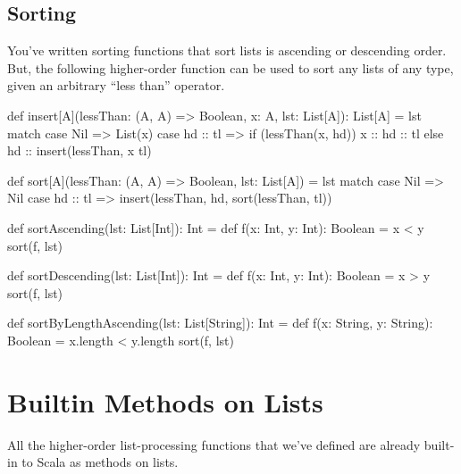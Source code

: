 \documentclass{book}
\begin{document}
\subsection{Sorting}

You've written sorting functions that sort lists is ascending or descending
order. But, the following higher-order function can be used to sort any
lists of any type, given an arbitrary ``less than'' operator.

\begin{scalacode}
def insert[A](lessThan: (A, A) => Boolean, x: A, lst: List[A]): List[A] = lst match {
  case Nil => List(x)
  case hd :: tl => {
    if (lessThan(x, hd)) {
      x :: hd :: tl
    }
    else {
      hd :: insert(lessThan, x tl)
    }
  }
}

def sort[A](lessThan: (A, A) => Boolean, lst: List[A]) = lst match {
  case Nil => Nil
  case hd :: tl => insert(lessThan, hd, sort(lessThan, tl))
}

def sortAscending(lst: List[Int]): Int = {
  def f(x: Int, y: Int): Boolean = x < y
  sort(f, lst)
}

def sortDescending(lst: List[Int]): Int = {
  def f(x: Int, y: Int): Boolean = x > y
  sort(f, lst)
}

def sortByLengthAscending(lst: List[String]): Int = {
  def f(x: String, y: String): Boolean = x.length < y.length
  sort(f, lst)
}
\end{scalacode}

\section{Builtin Methods on Lists}

All the higher-order list-processing functions that we've defined are already
built-in to Scala as methods on lists.
\end{document}
